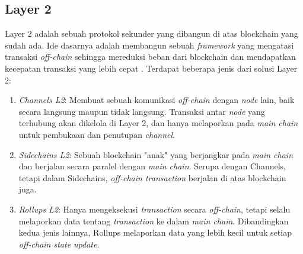\subsection{Layer 2}
\label{subsec:layer-2}

Layer 2 adalah sebuah protokol sekunder yang dibangun di atas blockchain yang sudah ada. Ide dasarnya adalah membangun sebuah \textit{framework} yang mengatasi transaksi \textit{off-chain} sehingga mereduksi beban dari blockchain dan mendapatkan kecepatan transaksi yang lebih cepat \parencite{sguanci2021layer}. Terdapat beberapa jenis dari solusi Layer 2:

\begin{enumerate}
	\item \textit{Channels L2}: Membuat sebuah komunikasi \textit{off-chain} dengan \textit{node} lain, baik secara langsung maupun tidak langsung. Transaksi antar \textit{node} yang terhubung akan dikelola di Layer 2, dan hanya melaporkan pada \textit{main chain} untuk pembukaan dan penutupan \textit{channel}.
	\item \textit{Sidechains L2}: Sebuah blockchain "anak" yang berjangkar pada \textit{main chain} dan berjalan secara paralel dengan \textit{main chain}. Serupa dengan Channels, tetapi dalam Sidechains, \textit{off-chain transaction} berjalan di atas blockchain juga.
	\item \textit{Rollups L2}: Hanya mengeksekusi \textit{transaction} secara \textit{off-chain}, tetapi selalu melaporkan data tentang \textit{transaction} ke dalam \textit{main chain}. Dibandingkan kedua jenis lainnya, Rollups melaporkan data yang lebih kecil untuk setiap \textit{off-chain state update}.
\end{enumerate}






